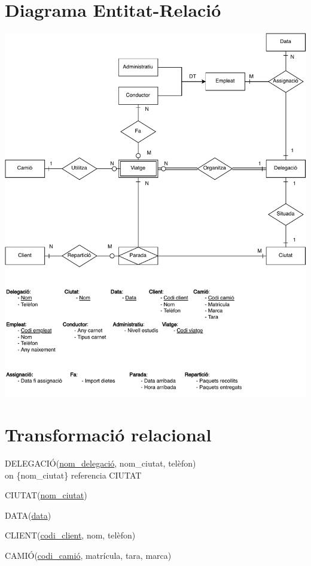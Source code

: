 \documentclass[a4paper,12pt]{article}
\begin{document}


\tableofcontents
\newpage
\section{Diagrama Entitat-Relació}
\begin{center}
	\noindent\includegraphics[width=\textwidth]{diagrama.pdf}
\end{center}

\newpage
\section{Transformació relacional}


DELEGACIÓ(\underline{nom\_delegació}, nom\_ciutat, telèfon) \\
on \{nom\_ciutat\} referencia CIUTAT

CIUTAT(\underline{nom\_ciutat})

DATA(\underline{data})

CLIENT(\underline{codi\_client}, nom, telèfon)

CAMIÓ(\underline{codi\_camió}, matrícula, tara, marca)
\end{document}

